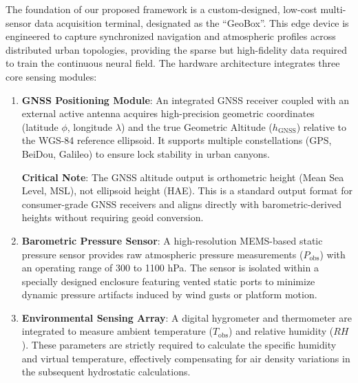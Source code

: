The foundation of our proposed framework is a custom-designed, low-cost multi-sensor data acquisition terminal, designated as the ``GeoBox''. This edge device is engineered to capture synchronized navigation and atmospheric profiles across distributed urban topologies, providing the sparse but high-fidelity data required to train the continuous neural field. The hardware architecture integrates three core sensing modules:
\begin{enumerate}
    \item \textbf{GNSS Positioning Module}: An integrated GNSS receiver coupled with an external active antenna acquires high-precision geometric coordinates (latitude $\phi$, longitude $\lambda$) and the true Geometric Altitude ($h_\text{GNSS}$) relative to the WGS-84 reference ellipsoid. It supports multiple constellations (GPS, BeiDou, Galileo) to ensure lock stability in urban canyons.
    
    \textbf{Critical Note}: The GNSS altitude output is orthometric height (Mean Sea Level, MSL), not ellipsoid height (HAE). This is a standard output format for consumer-grade GNSS receivers and aligns directly with barometric-derived heights without requiring geoid conversion.
    
    \item \textbf{Barometric Pressure Sensor}: A high-resolution MEMS-based static pressure sensor provides raw atmospheric pressure measurements ($P_\text{obs}$) with an operating range of 300 to 1100 hPa. The sensor is isolated within a specially designed enclosure featuring vented static ports to minimize dynamic pressure artifacts induced by wind gusts or platform motion.
    \item \textbf{Environmental Sensing Array}: A digital hygrometer and thermometer are integrated to measure ambient temperature ($T_\text{obs}$) and relative humidity ($RH$). These parameters are strictly required to calculate the specific humidity and virtual temperature, effectively compensating for air density variations in the subsequent hydrostatic calculations.
\end{enumerate}

